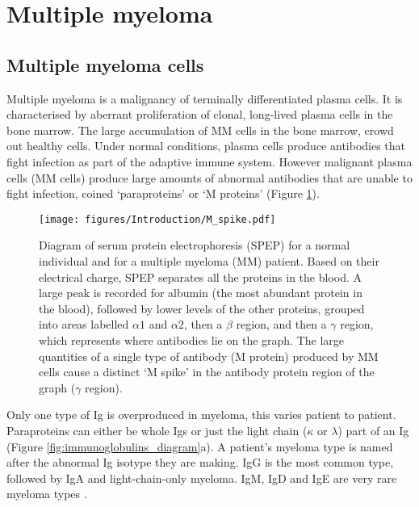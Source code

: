 \section{Multiple myeloma}\label{sec:MM}
\subsection{Multiple myeloma cells}
Multiple myeloma is a malignancy of terminally differentiated plasma cells.
It is characterised by aberrant proliferation of clonal, long-lived plasma cells in the bone marrow\cite{anderson2011pathogenesis}.
The large accumulation of MM cells in the bone marrow, crowd out healthy cells.
Under normal conditions, plasma cells produce antibodies that fight infection as part of the adaptive immune system.
However malignant plasma cells (MM cells) produce large amounts of abnormal antibodies that are unable to fight infection, coined `paraproteins' or `M proteins' (Figure \ref{fig:m_spike}).
%
\begin{figure}[htb]
\centering
\texttt{[image: figures/Introduction/M\_spike.pdf]}
\caption[M spike diagram]{Diagram of serum protein electrophoresis (SPEP) for a normal individual and for a multiple myeloma (MM) patient.
Based on their electrical charge, SPEP separates all the proteins in the blood.
A large peak is recorded for albumin (the most abundant protein in the blood), followed by lower levels of the other proteins, grouped into areas labelled $\alpha1$ and $\alpha2$, then a $\beta$ region, and then a $\gamma$ region, which represents where antibodies lie on the graph.
The large quantities of a single type of antibody (M protein) produced by MM cells cause a distinct `M spike' in the antibody protein region of the graph ($\gamma$ region).}
\label{fig:m_spike}
\end{figure}
Only one type of Ig is overproduced in myeloma, this varies patient to patient.
Paraproteins can either be whole Igs or just the light chain ($\kappa$ or $\lambda$) part of an Ig (Figure \ref{fig:immunoglobulins_diagram}a).
A patient's myeloma type is named after the abnormal Ig isotype they are making.
IgG is the most common type, followed by IgA and light-chain-only myeloma.
IgM, IgD and IgE are very rare myeloma types \cite{cancerresearchuktypes}.

